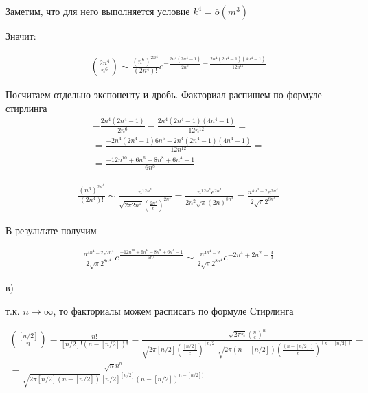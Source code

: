 \documentclass[a4paper, 11pt]{article}
\begin{document}
Заметим, что для него выполняется условие $k^4 = \bar{o}\left(m^3\right)$

Значит:

\begin{equation*}
\begin{aligned}
\binom{2n^4}{n^6} \sim 
	\frac{\left(n^6\right)^{2n^4}}{(2n^4)!} 
	e^{
		-\frac{2n^4\left(2n^4 -1\right)}{2n^6}
		-\frac{2n^4\left(2n^4 -1\right)\left(4n^4 - 1\right)}{12n^{12}}
	}
\end{aligned}
\end{equation*}

Посчитаем отдельно экспоненту и дробь. Факториал распишем по формуле стирлинга
\begin{equation}
\begin{aligned}
-\frac{2n^4\left(2n^4 -1\right)}{2n^6}
-\frac{2n^4\left(2n^4 -1\right)\left(4n^4 -1\right)}{12n^{12}}
=
\\
=
\frac{-2n^4\left(2n^4 -1\right)6n^6 - 2n^4\left(2n^4 -1\right)\left(4n^4 -1\right)}{12n^{12}}
=
\\
=
\frac{-12n^{10}+6n^6-8n^8+6n^4-1}{6n^8}
\end{aligned}
\end{equation}

\begin{equation}
\begin{aligned}
\frac{\left(n^6\right)^{2n^4}}{(2n^4)!} \sim
\frac{n^{12n^4}}{\sqrt{2\pi 2n^4} \left(\frac{2n^4}{e}\right)^{2n^4}} =
\frac{n^{12n^4}e^{2n^4}}{2n^2\sqrt{\pi} (2n)^{8n^4}} = 
\frac{n^{4n^4-2}e^{2n^4}}{2\sqrt{\pi} 2^{8n^4}}
\end{aligned}
\end{equation}

В результате получим

\begin{equation}
\begin{aligned}
    \frac{n^{4n^4-2}e^{2n^4}}{2\sqrt{\pi} 2^{8n^4}}
    e^{
        \frac{-12n^{10}+6n^6-8n^8+6n^4-1}{6n^8}
    }
\sim
    \frac{n^{4n^4-2}}{2\sqrt{\pi} 2^{8n^4}}
    e^{
        -2n^4 + 2n^2 -\frac{4}{3}
    }
\end{aligned}
\end{equation}

в)

т.к. $n \to \infty$, то факториалы можем расписать по формуле Стирлинга

\begin{equation*}
\begin{aligned}
\binom{[n/2]}{n} = \frac{n!}{[n/2]!(n-[n/2])!} = 
\frac{
	\sqrt{2\pi n}\left(\frac{n}{e}\right)^n
}{
 \sqrt{2\pi [n/2]}
 \left(
 \frac{[n/2]}{e}
 \right)
 ^{[n/2]}
 \sqrt{2\pi (n-[n/2])}
 \left(
 \frac{(n-[n/2])}{e}
 \right)
 ^{(n-[n/2])}
}
=
\\
=
\frac{
	\sqrt{n}n^n
}{
	\sqrt{2\pi [n/2](n-[n/2])} [n/2]^{[n/2]}(n-[n/2])^{n-[n/2])}
}
\end{aligned}
\end{equation*}
\end{document}
